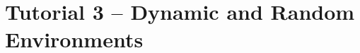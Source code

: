 \section{Tutorial 3 -- Dynamic and Random Environments}

{
  \let\section\subsection
  \let\subsection\subsubsection
  \let\subsubsection\paragraph
  
  
  }


